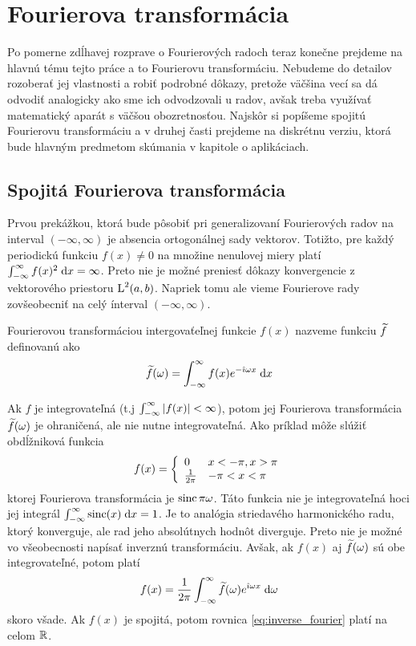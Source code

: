 \section{Fourierova transformácia}
Po pomerne zdĺhavej rozprave o Fourierových radoch teraz konečne
prejdeme na hlavnú tému tejto práce a to Fourierovu transformáciu.
Nebudeme do detailov rozoberať jej vlastnosti a robiť podrobné dôkazy,
pretože väčšina vecí sa dá odvodiť analogicky ako sme ich odvodzovali
u radov, avšak treba využívať matematický aparát s väčšou
obozretnosťou. Najskôr si popíšeme spojitú Fourierovu transformáciu a
v druhej časti prejdeme na diskrétnu verziu, ktorá bude hlavným
predmetom skúmania v kapitole o aplikáciach.

\subsection{Spojitá Fourierova transformácia}
Prvou prekážkou, ktorá bude pôsobiť pri generalizovaní Fourierových
radov na interval $(-\infty,\infty)$ je absencia ortogonálnej sady
vektorov. Totižto, pre každý periodickú funkciu $f(x)\not=0$ na
množine nenulovej miery platí $\int_{-\infty}^{\infty} f(x)^2 \; \mathrm{d} x = \infty$.
Preto nie je možné preniesť dôkazy konvergencie z vektorového
priestoru $\mbox{L}^2(a,b)$. Napriek tomu ale vieme Fourierove rady zovšeobecniť
na celý ínterval $(-\infty,\infty)$.
\begin{definicia}
    Fourierovou transformáciou intergovaťeľnej funkcie $f(x)$ nazveme
    funkciu $\widetilde{f}$ definovanú ako
    \begin{equation*}
        \widetilde{f}(\omega) = \int_{-\infty}^{\infty} f(x) e^{-\hat{\imath} \omega x} \; \mathrm{d} x
    \end{equation*}
    \label{def:fourier_transform}
\end{definicia}
Ak $f$ je integrovateľná (t.j $\int_{-\infty}^{\infty} |f(x)| < \infty$), potom jej
Fourierova transformácia $\widetilde{f}(\omega)$ je ohraničená, ale nie nutne
integrovateľná. Ako príklad môže slúžiť obdĺžniková funkcia 
\begin{equation*}
    f(x) = \left\{  \begin{array}{l l}
                        0&x <-\pi, x>\pi \\
                        \frac{1}{2\pi}& -\pi<x<\pi
                    \end{array}
            \right.
\end{equation*}
ktorej Fourierova transformácia je $\operatorname{sinc}{\pi \omega}$. Táto funkcia
nie je integrovateľná hoci jej integrál $\int_{-\infty}^{\infty} \operatorname{sinc}(x) \; \mathrm{d} x = 1$.
Je to analógia striedavého harmonického radu, ktorý konverguje, ale
rad jeho absolútnych hodnôt diverguje.
Preto nie je možné vo všeobecnosti napísať inverznú transformáciu.
Avšak, ak $f(x)$ aj $\widetilde{f}(\omega)$ sú obe integrovateľné, potom platí
\begin{equation}
    f(x) = \frac{1}{2\pi} \int_{-\infty}^{\infty} 
        \widetilde{f}(\omega) e^{\hat{\imath} \omega x} \; \mathrm{d} \omega
    \label{eq:inverse_fourier}
\end{equation}
skoro všade. Ak $f(x)$ je spojitá, potom rovnica
\eqref{eq:inverse_fourier} platí na celom ${\mathbb R}$.

